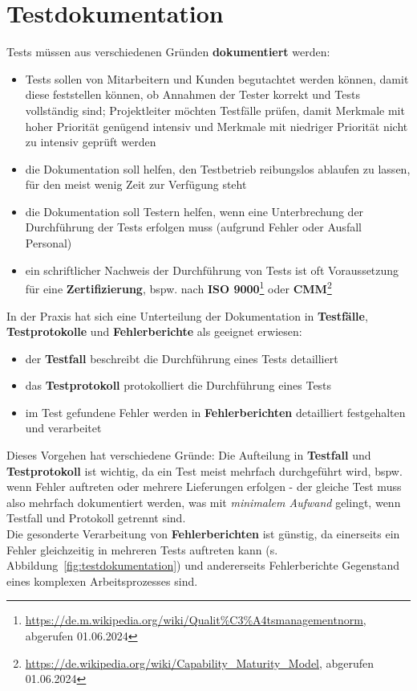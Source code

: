 \section{Testdokumentation}
Tests müssen aus verschiedenen Gründen \textbf{dokumentiert} werden:

\begin{itemize}
    \item Tests sollen von Mitarbeitern und Kunden begutachtet werden können, damit diese feststellen können, ob Annahmen der Tester korrekt und Tests vollständig sind; Projektleiter möchten Testfälle prüfen, damit Merkmale mit hoher Priorität genügend intensiv und Merkmale mit niedriger Priorität nicht zu intensiv geprüft werden
    \item die Dokumentation soll helfen, den Testbetrieb reibungslos ablaufen zu lassen, für den meist wenig Zeit zur Verfügung steht
    \item die Dokumentation soll Testern helfen, wenn eine Unterbrechung der Durchführung der Tests erfolgen muss (aufgrund Fehler oder Ausfall Personal)
    \item ein schriftlicher Nachweis der Durchführung von Tests ist oft Voraussetzung für eine \textbf{Zertifizierung}, bspw. nach \textbf{ISO 9000}\footnote{
    \url{https://de.m.wikipedia.org/wiki/Qualit\%C3\%A4tsmanagementnorm}, abgerufen 01.06.2024
    } oder \textbf{CMM}\footnote{
    \url{https://de.wikipedia.org/wiki/Capability_Maturity_Model}, abgerufen 01.06.2024
    }
\end{itemize}

\noindent
In der Praxis hat sich eine Unterteilung der Dokumentation in \textbf{Testfälle}, \textbf{Testprotokolle} und \textbf{Fehlerberichte} als geeignet erwiesen:

\begin{itemize}
    \item der \textbf{Testfall} beschreibt die Durchführung eines Tests detailliert
    \item das \textbf{Testprotokoll} protokolliert die Durchführung eines Tests
    \item im Test gefundene Fehler werden in \textbf{Fehlerberichten} detailliert festgehalten und verarbeitet
\end{itemize}

\noindent
Dieses Vorgehen hat verschiedene Gründe: Die Aufteilung in \textbf{Testfall} und \textbf{Testprotokoll} ist wichtig, da ein Test meist mehrfach durchgeführt wird, bspw. wenn Fehler auftreten oder mehrere Lieferungen erfolgen - der gleiche Test muss also mehrfach dokumentiert werden, was mit \textit{minimalem Aufwand} gelingt, wenn Testfall und Protokoll getrennt sind.\\
Die gesonderte Verarbeitung von \textbf{Fehlerberichten} ist günstig, da einerseits ein Fehler gleichzeitig in mehreren Tests auftreten kann (s. Abbildung~\ref{fig:testdokumentation}) und andererseits Fehlerberichte Gegenstand eines komplexen Arbeitsprozesses sind.

